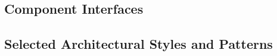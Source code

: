 \documentclass[12pt,titlepage]{article}
\begin{document}

\clearpage
\newpage

\subsection{Component Interfaces}
\subsection{Selected Architectural Styles and Patterns}
\end{document}

